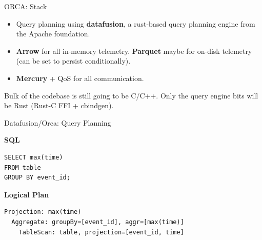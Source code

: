 \documentclass{beamer}
\begin{document}
%
%
\begin{frame}{ORCA: Stack}
  \begin{itemize}
    \item Query planning using \textbf{datafusion}, a rust-based query planning engine from the Apache foundation.
    \item \textbf{Arrow} for all in-memory telemetry. \textbf{Parquet} maybe for on-disk telemetry (can be set to persist conditionally).
    \item \textbf{Mercury} + QoS for all communication.
  \end{itemize}

Bulk of the codebase is still going to be C/C++. Only the query engine bits will be Rust (Rust-C FFI + cbindgen).
\end{frame}


\begin{frame}[fragile]{Datafusion/Orca: Query Planning}

\textbf{SQL}
  \begin{verbatim}
SELECT max(time)
FROM table
GROUP BY event_id;
  \end{verbatim}

\textbf{Logical Plan}
  \begin{verbatim}
Projection: max(time)
  Aggregate: groupBy=[event_id], aggr=[max(time)]
    TableScan: table, projection=[event_id, time]
  \end{verbatim}
\end{frame}
\end{document}
